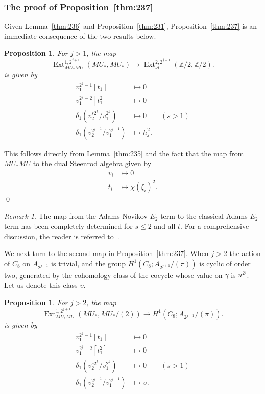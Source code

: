 \documentclass{amsart}
\newtheorem{prop}[equation]{Proposition}
\newtheorem{rem}[equation]{Remark}
\theoremstyle{definition}
\theoremstyle{remark}
\newtheorem{rem}[equation]{Remark}
\newenvironment{pf}{\bigskip{\em Proof:\/}}{\qed\medskip}
\newcommand{\ext}{\operatorname{Ext}}
\newcommand{\Z}{{\mathbb Z}}
\newcommand{\ze}{C_{8}}
\newcommand{\mustarmu}{MU_{\ast}MU}
\newcommand{\mustar}{MU_{\ast}}
\newcommand{\theClass}{\upsilon}
\newcommand{\sta}{\mathcal A}
\begin{document}
\subsubsection{The proof of Proposition~\ref{thm:237}}
\label{sec:map-classical-adams}

Given Lemma~\ref{thm:236} and Proposition~\ref{thm:231},
Proposition~\ref{thm:237} is an immediate consequence of the two
results below.

\begin{prop}
\label{thm:144} For $j>1$, the map
\[
\ext^{1,2^{j+1}}_{\mustarmu}(\mustar,\mustar) \to \ext^{2,2^{j+1}}_{\sta}(\Z/2,\Z/2).
\]
is given by
\begin{align*}
v_{1}^{2^{j}-1}[t_{1}] & \mapsto 0 \\
v_{1}^{2^{j}-2}[t_{1}^{2}] & \mapsto 0 \\
\delta_{1}(v_{2}^{s 2^{k}}/v_{1}^{2^{k}}) & \mapsto 0 \qquad (s > 1)\\
\delta_{1}(v_{2}^{2^{j-1}}/v_{1}^{2^{j-1}}) & \mapsto
h_{j}^{2}.
\end{align*}
\end{prop}

\begin{pf}
This follows directly from Lemma~\ref{thm:235} and the fact that the
map from $\mustarmu$ to the dual Steenrod algebra 
given by
\begin{align*}
v_{i} &\mapsto 0 \\
t_{i} &\mapsto \chi(\xi_{i})^{2}.
\end{align*}
\end{pf}


\begin{rem}
\label{rem:54}
The map from the Adams-Novikov $E_{2}$-term to the classical Adams
$E_{2}$-term has been completely determined for $s\le 2$ and all $t$.
For a comprehensive discussion, the reader is referred
to~\cite[Chapter~5]{Rav:MUnew}.   
\end{rem}

We next turn to the second map in Proposition~\ref{thm:237}.  When
$j>2$ the action of $\ze$ on $A_{2^{j+1}}$ is trivial, and the group
$H^{1}(\ze;A_{2^{j+1}}/(\pi))$ is cyclic of order two, generated by
the cohomology class of the cocycle whose value on $\gamma$ is
$u^{2^{j}}$.  Let us denote this class $\theClass$.

\begin{prop}
\label{thm:234} For $j>2$, the map
\[
\ext^{1,2^{j+1}}_{\mustarmu}(\mustar,\mustar/(2))\to
H^{1}(\ze;A_{2^{j+1}}/(\pi)).
\]
is given by
\begin{align*}
v_{1}^{2^{j}-1}[t_{1}] &\mapsto 0 \\
v_{1}^{2^{j}-2}[t_{1}^{2}] &\mapsto 0 \\
\delta_{1}(v_{2}^{s 2^{k}}/v_{1}^{2^{k}}) & \mapsto 0 \qquad (s > 1)\\
\delta_{1}(v_{2}^{2^{j-1}}/v_{1}^{2^{j-1}}) & \mapsto \theClass.
\end{align*}
\end{prop}
\end{document}

